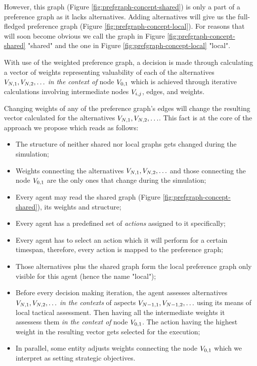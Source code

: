 However, this graph (Figure \ref{fig:prefgraph-concept-shared}) is only a part of a preference graph as it lacks
alternatives. Adding alternatives will give us the full-fledged preference graph (Figure
\ref{fig:prefgraph-concept-local}). For reasons that will soon become obvious we call the graph in Figure
\ref{fig:prefgraph-concept-shared} "shared" and the one in Figure \ref{fig:prefgraph-concept-local} "local".

With use of the weighted preference graph, a decision is made through calculating a vector of weights representing
valuability of each of the alternatives $V_{N,1}, V_{N,2},\ldots$ \textit{in the context of} node $V_{0,1}$ which is
achieved through iterative calculations involving intermediate nodes $V_{i,j}$, edges, and weights.

Changing weights of any of the preference graph's edges will change the resulting vector calculated for the alternatives
$V_{N,1}, V_{N,2},\ldots$. This fact is at the core of the approach we propose which reads as follows:

\begin{itemize}
    \item The structure of neither shared nor local graphs gets changed during the simulation;
    \item Weights connecting the alternatives $V_{N,1}, V_{N,2},\ldots$ and those connecting the node $V_{0,1}$ are the only ones that
        change during the simulation;
    \item Every agent may read the shared graph (Figure \ref{fig:prefgraph-concept-shared}), its weights and structure;
    \item Every agent has a predefined set of \textit{actions} assigned to it specifically;
    \item Every agent has to select an action which it will perform for a certain timespan, therefore, every action is
        mapped to the preference graph;
    \item Those alternatives plus the shared graph form the local preference graph only visible for this agent (hence
        the name "local");
    \item Before every decision making iteration, the agent assesses alternatives $V_{N,1}, V_{N,2},\ldots$ \textit{in the contexts} of
        aspects $ V_{N-1,1}, V_{N-1,2}, \ldots $ using its means of local tactical assessment. Then having all the intermediate weights
        it assessess them \textit{in the context of} node $V_{0,1}$. The action having the highest weight in the
        resulting vector gets selected for the execution;
    \item In parallel, some entity adjusts weights connecting the node $V_{0,1}$ which we interpret as setting
        strategic objectives.
\end{itemize}


